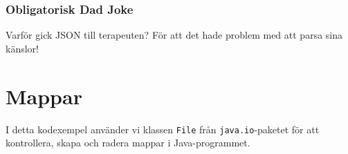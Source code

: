 \hypertarget{obligatorisk-dad-joke}{%
\subsubsection{Obligatorisk Dad Joke}\label{obligatorisk-dad-joke}}

Varför gick JSON till terapeuten? För att det hade problem med att parsa
sina känslor!

\hypertarget{mappar}{%
\section{Mappar}\label{mappar}}

I detta kodexempel använder vi klassen \texttt{File} från
\texttt{java.io}-paketet för att kontrollera, skapa och radera mappar i
Java-programmet.

